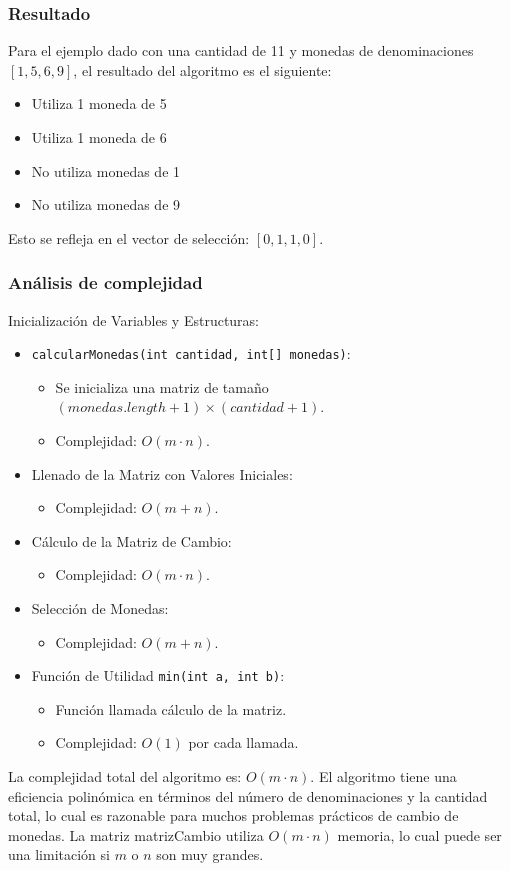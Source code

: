 \subsubsection{Resultado}
Para el ejemplo dado con una cantidad de 11 y monedas de denominaciones \([1, 5, 6, 9]\), el resultado del algoritmo es el siguiente:
\begin{itemize}
    \item Utiliza 1 moneda de 5
    \item Utiliza 1 moneda de 6
    \item No utiliza monedas de 1
    \item No utiliza monedas de 9
\end{itemize}
Esto se refleja en el vector de selección: \([0, 1, 1, 0]\).

\subsubsection{Análisis de complejidad}
Inicialización de Variables y Estructuras:
\begin{itemize}
    \item \texttt{calcularMonedas(int cantidad, int[] monedas)}:
    \begin{itemize}
        \item Se inicializa una matriz de tamaño \((monedas.length + 1) \times (cantidad + 1)\).
        \item Complejidad: \(O(m \cdot n)\).
    \end{itemize}
    \item Llenado de la Matriz con Valores Iniciales:
    \begin{itemize}
        \item Complejidad: \(O(m + n)\).
    \end{itemize}
    \item Cálculo de la Matriz de Cambio:
    \begin{itemize}
        \item Complejidad: \(O(m \cdot n)\).
    \end{itemize}
    \item Selección de Monedas:
    \begin{itemize}
        \item Complejidad: \(O(m + n)\).
    \end{itemize}
    \item Función de Utilidad \texttt{min(int a, int b)}:
    \begin{itemize}
        \item Función llamada cálculo de la matriz.
        \item Complejidad: \(O(1)\) por cada llamada.
    \end{itemize}
\end{itemize}

La complejidad total del algoritmo es: \(O(m \cdot n)\). El algoritmo tiene una eficiencia polinómica en términos del número de denominaciones y la cantidad total, lo cual es razonable para muchos problemas prácticos de cambio de monedas. La matriz matrizCambio utiliza \(O(m \cdot n)\) memoria, lo cual puede ser una limitación si \(m\) o \(n\) son muy grandes.


